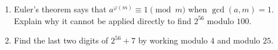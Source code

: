 \begin{enumerate}
\item[(a)] Euler's theorem says that $a^{\varphi(m)}\equiv1\pmod m$ when $\gcd(a,m)=1$. Explain why it cannot be applied directly to find $2^{56}$ modulo $100$.
\item[(b)] Find the last two digits of $2^{56}+7$ by working modulo $4$ and modulo $25$.
\end{enumerate}

